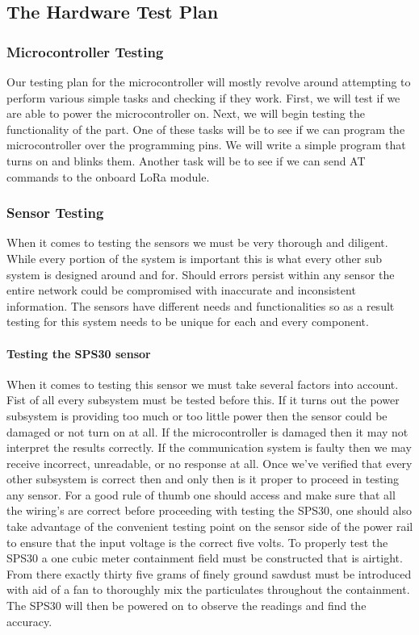 \subsection{The Hardware Test Plan}
\subsubsection{Microcontroller Testing}
Our testing plan for the microcontroller will mostly revolve around attempting to perform various simple tasks and checking if they work. First, we will test if we are able to power the microcontroller on. Next, we will begin testing the functionality of the part. One of these tasks will be to see if we can program the microcontroller over the programming pins. We will write a simple program that turns on and blinks them. Another task will be to see if we can send AT commands to the onboard LoRa module.

\subsubsection{Sensor Testing}
When it comes to testing the sensors we must be very thorough and diligent. While every portion of the system is important this is what every other sub system is designed around and for. Should errors persist within any sensor the entire network could be compromised with inaccurate and inconsistent information. The sensors have different needs and functionalities so as a result testing for this system needs to be unique for each and every component.
\paragraph{Testing the SPS30 sensor}
When it comes to testing this sensor we must take several factors into account. Fist of all every subsystem must be tested before this. If it turns out the power subsystem is providing too much or too little power then the sensor could be damaged or not turn on at all. If the microcontroller is damaged then it may not interpret the results correctly. If the communication system is faulty then we may receive incorrect, unreadable, or no response at all. Once we've verified that every other subsystem is correct then and only then is it proper to proceed in testing any sensor.
For a good rule of thumb one should access and make sure that all the wiring's are correct before proceeding with testing the SPS30, one should also take advantage of the convenient testing point on the sensor side of the power rail to ensure that the input voltage is the correct five volts. To properly test the SPS30 a one cubic meter containment field must be constructed that is airtight. From there exactly thirty five grams of finely ground sawdust must be introduced with aid of a fan to thoroughly mix the particulates throughout the containment. The SPS30 will then be powered on to observe the readings and find the accuracy.

